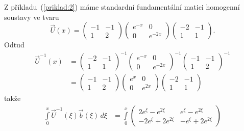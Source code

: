 \begin{sol}
   Z příkladu~(\ref{priklad:2}) máme standardní fundamentální matici homogenní soustavy ve tvaru
   \[
      \vec{U}(x) = 
      \begin{pmatrix}
         -1 &  -1\\
         1 &  2
      \end{pmatrix}
      \begin{pmatrix}
         e^{-x} &  0\\
         0 &  e^{-2x}
      \end{pmatrix}
      \begin{pmatrix}
         -2 & -1\\
          1 &  1
      \end{pmatrix}.
   \]
   Odtud
   \[
      \begin{split}
      \vec{U}^{-1}(x) &= 
      \begin{pmatrix}
         -2 & -1\\
          1 &  1
      \end{pmatrix}^{-1}
      \begin{pmatrix}
         e^{-x} &  0\\
         0 &  e^{-2x}
      \end{pmatrix}^{-1}
      \begin{pmatrix}
         -1 &  -1\\
         1 &  2
      \end{pmatrix}^{-1}\\
      &=
      \begin{pmatrix}
         -1 &  -1\\
         1 &  2
      \end{pmatrix}
      \begin{pmatrix}
         e^{x} &  0\\
         0 &  e^{2x}
      \end{pmatrix}
      \begin{pmatrix}
         -2 & -1\\
          1 &  1
      \end{pmatrix}
      \end{split}
   \]
   takže
   \[
      \begin{split}
      \int\limits_{0}^x\vec{U}^{-1}(\xi)\vec{b}(\xi)\,d\xi
                   &=\int\limits_{0}^x
                      \begin{pmatrix}
                        2e^{\xi}-e^{2\xi} & e^{\xi}-e^{2\xi} \\ -2e^{\xi}+2e^{2\xi} & -e^{\xi}+2e^{2\xi}

\end{pmatrix}
\end{split}\]
\end{sol}

